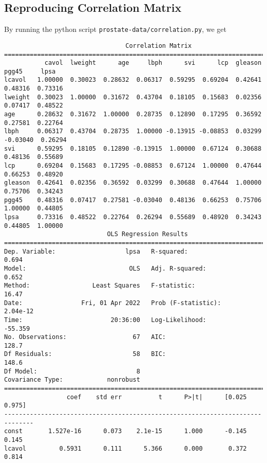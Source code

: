 \documentclass[11pt]{article}
\theoremstyle{definition}
\begin{document}
\subsection{Reproducing Correlation Matrix}
By running the python script \texttt{prostate-data/correlation.py}, we get
{\footnotesize
\begin{verbatim}
                                 Correlation Matrix
========================================================================================
           cavol  lweight      age     lbph      svi      lcp  gleason    pgg45     lpsa
lcavol   1.00000  0.30023  0.28632  0.06317  0.59295  0.69204  0.42641  0.48316  0.73316
lweight  0.30023  1.00000  0.31672  0.43704  0.18105  0.15683  0.02356  0.07417  0.48522
age      0.28632  0.31672  1.00000  0.28735  0.12890  0.17295  0.36592  0.27581  0.22764
lbph     0.06317  0.43704  0.28735  1.00000 -0.13915 -0.08853  0.03299 -0.03040  0.26294
svi      0.59295  0.18105  0.12890 -0.13915  1.00000  0.67124  0.30688  0.48136  0.55689
lcp      0.69204  0.15683  0.17295 -0.08853  0.67124  1.00000  0.47644  0.66253  0.48920
gleason  0.42641  0.02356  0.36592  0.03299  0.30688  0.47644  1.00000  0.75706  0.34243
pgg45    0.48316  0.07417  0.27581 -0.03040  0.48136  0.66253  0.75706  1.00000  0.44805
lpsa     0.73316  0.48522  0.22764  0.26294  0.55689  0.48920  0.34243  0.44805  1.00000
                            OLS Regression Results                            
==============================================================================
Dep. Variable:                   lpsa   R-squared:                       0.694
Model:                            OLS   Adj. R-squared:                  0.652
Method:                 Least Squares   F-statistic:                     16.47
Date:                Fri, 01 Apr 2022   Prob (F-statistic):           2.04e-12
Time:                        20:36:00   Log-Likelihood:                -55.359
No. Observations:                  67   AIC:                             128.7
Df Residuals:                      58   BIC:                             148.6
Df Model:                           8                                         
Covariance Type:            nonrobust                                         
==============================================================================
                 coef    std err          t      P>|t|      [0.025      0.975]
------------------------------------------------------------------------------
const       1.527e-16      0.073    2.1e-15      1.000      -0.145       0.145
lcavol         0.5931      0.111      5.366      0.000       0.372       0.814

\end{verbatim}}
\end{document}
